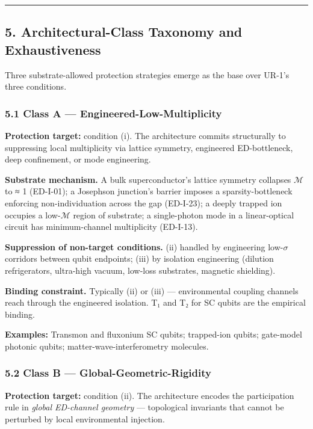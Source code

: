 \documentclass[
  11pt,
  a4paper,
]{article}
\begin{document}
\begin{center}\rule{0.5\linewidth}{0.5pt}\end{center}

\subsection{5. Architectural-Class Taxonomy and
Exhaustiveness}\label{architectural-class-taxonomy-and-exhaustiveness}

Three substrate-allowed protection strategies emerge as the base over
UR-1's three conditions.

\subsubsection{5.1 Class A ---
Engineered-Low-Multiplicity}\label{class-a-engineered-low-multiplicity}

\textbf{Protection target:} condition (i). The architecture commits
structurally to suppressing local multiplicity via lattice symmetry,
engineered ED-bottleneck, deep confinement, or mode engineering.

\textbf{Substrate mechanism.} A bulk superconductor's lattice symmetry
collapses \(\mathcal{M}\) to ≈ 1 (ED-I-01); a Josephson junction's
barrier imposes a sparsity-bottleneck enforcing non-individuation across
the gap (ED-I-23); a deeply trapped ion occupies a low-\(\mathcal{M}\)
region of substrate; a single-photon mode in a linear-optical circuit
has minimum-channel multiplicity (ED-I-13).

\textbf{Suppression of non-target conditions.} (ii) handled by
engineering low-\(\sigma\) corridors between qubit endpoints; (iii) by
isolation engineering (dilution refrigerators, ultra-high vacuum,
low-loss substrates, magnetic shielding).

\textbf{Binding constraint.} Typically (ii) or (iii) --- environmental
coupling channels reach through the engineered isolation. T₁ and T₂ for
SC qubits are the empirical binding.

\textbf{Examples:} Transmon and fluxonium SC qubits; trapped-ion qubits;
gate-model photonic qubits; matter-wave-interferometry molecules.

\subsubsection{5.2 Class B ---
Global-Geometric-Rigidity}\label{class-b-global-geometric-rigidity}

\textbf{Protection target:} condition (ii). The architecture encodes the
participation rule in \emph{global ED-channel geometry} --- topological
invariants that cannot be perturbed by local environmental injection.
\end{document}
